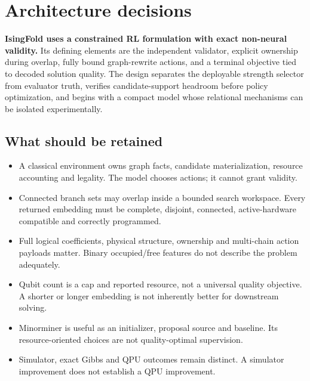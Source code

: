 \section*{Architecture decisions}
\textbf{IsingFold uses a constrained RL formulation with exact non-neural validity.} Its defining elements are the independent validator, explicit ownership during overlap, fully bound graph-rewrite actions, and a terminal objective tied to decoded solution quality. The design separates the deployable strength selector from evaluator truth, verifies candidate-support headroom before policy optimization, and begins with a compact model whose relational mechanisms can be isolated experimentally.

\subsection*{What should be retained}
\begin{itemize}
\item A classical environment owns graph facts, candidate materialization, resource accounting and legality. The model chooses actions; it cannot grant validity.
\item Connected branch sets may overlap inside a bounded search workspace. Every returned embedding must be complete, disjoint, connected, active-hardware compatible and correctly programmed.
\item Full logical coefficients, physical structure, ownership and multi-chain action payloads matter. Binary occupied/free features do not describe the problem adequately.
\item Qubit count is a cap and reported resource, not a universal quality objective. A shorter or longer embedding is not inherently better for downstream solving.
\item Minorminer is useful as an initializer, proposal source and baseline. Its resource-oriented choices are not quality-optimal supervision.
\item Simulator, exact Gibbs and QPU outcomes remain distinct. A simulator improvement does not establish a QPU improvement.
\end{itemize}

